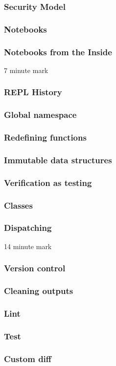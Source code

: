 \begin{frame}
\frametitle{Security Model}
\end{frame}

\begin{frame}
\frametitle{Notebooks}
\end{frame}

\begin{frame}
\frametitle{Notebooks from the Inside}
\end{frame}

7 minute mark

\begin{frame}
\frametitle{REPL History}
\end{frame}

\begin{frame}
\frametitle{Global namespace}
\end{frame}

\begin{frame}
\frametitle{Redefining functions}
\end{frame}

\begin{frame}
\frametitle{Immutable data structures}
\end{frame}

\begin{frame}
\frametitle{Verification as testing}
\end{frame}

\begin{frame}
\frametitle{Classes}
\end{frame}

\begin{frame}
\frametitle{Dispatching}
\end{frame}

14 minute mark

\begin{frame}
\frametitle{Version control}
\end{frame}

\begin{frame}
\frametitle{Cleaning outputs}
\end{frame}

\begin{frame}
\frametitle{Lint}
\end{frame}

\begin{frame}
\frametitle{Test}
\end{frame}

\begin{frame}
\frametitle{Custom diff}
\end{frame}


